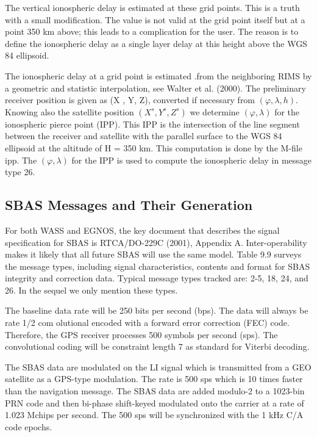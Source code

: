 		The vertical ionospheric delay is estimated at these grid points. This is a truth with a small modification. The value is not valid at the grid point itself but at a point 350 km above; this leads to a complication for the user. The reason is to define the ionospheric delay as a single layer delay at this height above the WGS 84 ellipsoid.
		
		The ionospheric delay at a grid point is estimated .from the neighboring RIMS by a geometric and statistic interpolation, see Walter et al. (2000). The preliminary receiver position is given as (X , Y, Z), converted if necessary from $(\varphi,\lambda,h)$. Knowing also the satellite position $(X^s , Y^s , Z^s )$ we determine $(\varphi,\lambda)$ for the ionospheric pierce point (IPP). This IPP is the intersection of the line segment between the receiver and satellite with the parallel surface to the WGS 84 ellipsoid at the altitude of H = 350 km. This computation is done by the M-file ipp. The $(\varphi,\lambda)$ for the IPP is used to compute the ionospheric delay in message type 26. 
	
	\subsection{SBAS Messages and Their Generation}
		For both WASS and EGNOS, the key document that describes the signal specification for SBAS is RTCA/DO-229C (2001), Appendix A. Inter-operability makes it likely that all future SBAS will use the same model. Table 9.9 surveys the message types, including signal characteristics, contents and format for SBAS integrity and correction data. Typical message types tracked are: 2-5, 18, 24, and 26. In the sequel we only mention these types.
		
		The baseline data rate will be 250 bits per second (bps). The data will always be rate 1/2 com olutional encoded with a forward error correction (FEC) code. Therefore, the GPS receiver processes 500 symbols per second (sps). The convolutional coding will be constraint length 7 as standard for Viterbi decoding.
		
		The SBAS data are modulated on the LI signal which is transmitted from a GEO satellite as a GPS-type modulation. The rate is 500 sps which is 10 times faster than the navigation message. The SBAS data are added modulo-2 to a 1023-bin PRN code and then bi-phase shift-keyed modulated onto the carrier at a rate of 1.023 Mchips per second. The 500 sps will be synchronized with the 1 kHz C/A code epochs.
		
